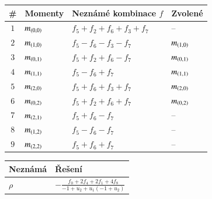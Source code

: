 \begin{table}[!h]
	\centering
	\begin{tabular}{c l l l}
		\toprule
		\# & Momenty & Neznámé kombinace $f$ & Zvolené\\
		\midrule
		\multirow{ 1}{*}{$1$} & \multirow{ 1}{*}{$m_{\left(0,0\right)}$} & $f_5+f_2+f_6+f_3+f_7$ & \multirow{ 1}{*}{--}\\ 
		\midrule
		\multirow{ 1}{*}{$2$} & \multirow{ 1}{*}{$m_{\left(1,0\right)}$} & $f_5-f_6-f_3-f_7$ & \multirow{ 1}{*}{$m_{\left(1,0\right)}$}\\ 
		\midrule
		\multirow{ 1}{*}{$3$} & \multirow{ 1}{*}{$m_{\left(0,1\right)}$} & $f_5+f_2+f_6-f_7$ & \multirow{ 1}{*}{$m_{\left(0,1\right)}$}\\ 
		\midrule
		\multirow{ 1}{*}{$4$} & \multirow{ 1}{*}{$m_{\left(1,1\right)}$} & $f_5-f_6+f_7$ & \multirow{ 1}{*}{$m_{\left(1,1\right)}$}\\ 
		\midrule
		\multirow{ 1}{*}{$5$} & \multirow{ 1}{*}{$m_{\left(2,0\right)}$} & $f_5+f_6+f_3+f_7$ & \multirow{ 1}{*}{$m_{\left(2,0\right)}$}\\ 
		\midrule
		\multirow{ 1}{*}{$6$} & \multirow{ 1}{*}{$m_{\left(0,2\right)}$} & $f_5+f_2+f_6+f_7$ & \multirow{ 1}{*}{$m_{\left(0,2\right)}$}\\ 
		\midrule
		\multirow{ 1}{*}{$7$} & \multirow{ 1}{*}{$m_{\left(2,1\right)}$} & $f_5+f_6-f_7$ & \multirow{ 1}{*}{--}\\ 
		\midrule
		\multirow{ 1}{*}{$8$} & \multirow{ 1}{*}{$m_{\left(1,2\right)}$} & $f_5-f_6-f_7$ & \multirow{ 1}{*}{--}\\ 
		\midrule
		\multirow{ 1}{*}{$9$} & \multirow{ 1}{*}{$m_{\left(2,2\right)}$} & $f_5+f_6+f_7$ & \multirow{ 1}{*}{--}\\ 
		\bottomrule
\end{tabular}\end{table}
\begin{table}[!h]
	\centering
	\begin{tabular}{l l}
		\toprule
		Neznámá & Řešení\\
		\midrule
		$\rho$ & $-\frac{f_0+2 f_4+2 f_1+4 f_8}{-1+u_2+ u_1 {(-1+u_2)}}$ \\ 
		\bottomrule
\end{tabular}\end{table}
